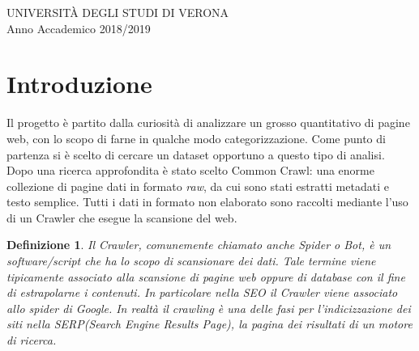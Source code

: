 \documentclass{article}
\title{Analisi della lingua su un dataset\\
            di pagine web tramite \MR \\ \vskip 5px
            \Large- Progetto Finale Big Data -}
\author{\\Crosara Marco VR434403}
\date{Marzo 2019 / Aprile 2019}
\newcommand{\CC}{Common Crawl}
\newtheorem*{definition}{Definizione}
\begin{document}
\maketitle
\thispagestyle{empty}

\vspace{\fill}

\begin{center}
  UNIVERSITÀ DEGLI STUDI DI VERONA\\
Anno Accademico 2018/2019
\end{center}

\newpage

\tableofcontents
\thispagestyle{empty}

\newpage



\section{Introduzione}

Il progetto è partito dalla curiosità di analizzare un grosso quantitativo di pagine web, con lo scopo di farne in qualche modo categorizzazione. Come punto di partenza si è scelto di cercare un dataset opportuno a questo tipo di analisi. Dopo una ricerca approfondita è stato scelto \CC{}\cite{commoncrawl}: una enorme collezione di pagine dati in formato \textit{raw}, da cui sono stati estratti metadati e testo semplice. Tutti i dati in formato non elaborato sono raccolti mediante l'uso di un Crawler che esegue la scansione del web.

\begin{definition}
Il Crawler, comunemente chiamato anche Spider o Bot, è un software/script che ha lo scopo di scansionare dei dati. Tale termine viene tipicamente associato alla scansione di pagine web oppure di database con il fine di estrapolarne i contenuti. In particolare nella SEO il Crawler viene associato allo spider di Google. In realtà il crawling è una delle fasi per l’indicizzazione dei siti nella SERP(Search Engine Results Page), la pagina dei risultati di un motore di ricerca.
\end{definition}
\end{document}
